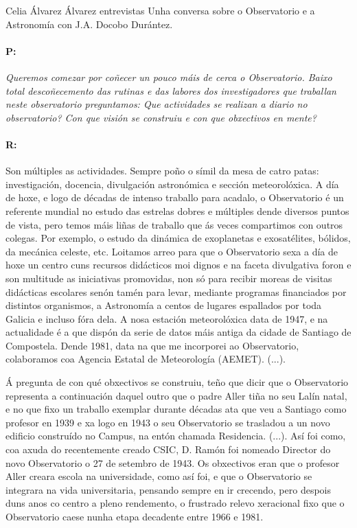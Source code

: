 \Titular*%
{Coñecendo o Observatorio Ramón María Aller}
{Celia Álvarez Álvarez}
{entrevistas}
{Unha conversa sobre o Observatorio e a Astronomía con J.A. Docobo Durántez.}


\begin{multicols}{2}

\paragraph{P:}

\textit{ Queremos comezar por coñecer un pouco máis de cerca o Observatorio.
Baixo total descoñecemento das rutinas e das labores dos investigadores que
traballan neste observatorio preguntamos: Que actividades se realizan a diario
no observatorio? Con que visión se construiu e con que obxectivos en mente? }

\paragraph{R:}

Son múltiples as actividades. Sempre poño o símil da mesa de
catro patas: investigación, docencia, divulgación astronómica e sección
meteorolóxica. A día de hoxe, e logo de décadas de intenso traballo para
acadalo, o Observatorio é un referente mundial no estudo das estrelas dobres e
múltiples dende diversos puntos de vista, pero temos máis liñas de traballo que
ás veces compartimos con outros colegas. Por exemplo, o estudo da dinámica de
exoplanetas e exosatélites, bólidos, da mecánica celeste, etc. Loitamos arreo
para que o Observatorio sexa a día de hoxe un centro cuns recursos didácticos
moi dignos e na faceta divulgativa foron e son multitude as iniciativas
promovidas, non só para recibir moreas de visitas didácticas escolares senón
tamén para levar, mediante programas financiados por distintos organismos, a
Astronomía a centos de lugares espallados por toda Galicia e incluso fóra dela.
A nosa estación meteorolóxica data de 1947, e na actualidade é a que dispón da
serie de datos máis antiga da cidade de Santiago de Compostela. Dende 1981,
data na que me incorporei ao Observatorio, colaboramos coa Agencia Estatal de
Meteorología (AEMET). (...).

Á pregunta de con qué obxectivos se construiu, teño que dicir que o
Observatorio representa a continuación daquel outro que o padre Aller tiña no
seu Lalín natal, e no que fixo un traballo exemplar durante décadas ata que veu
a Santiago como profesor en 1939 e xa logo en 1943 o seu Observatorio se
trasladou a un novo edificio construído no Campus, na entón chamada Residencia.
(...). Así foi como, coa axuda do recentemente creado CSIC, D. Ramón foi
nomeado Director do novo Observatorio o 27 de setembro de 1943. Os obxectivos
eran que o profesor Aller creara escola na universidade, como así foi, e que o
Observatorio se integrara na vida universitaria, pensando sempre en ir
crecendo, pero despois duns anos co centro a pleno rendemento, o frustrado
relevo xeracional fixo que o Observatorio caese nunha etapa decadente entre
1966 e 1981.


\end{multicols}
